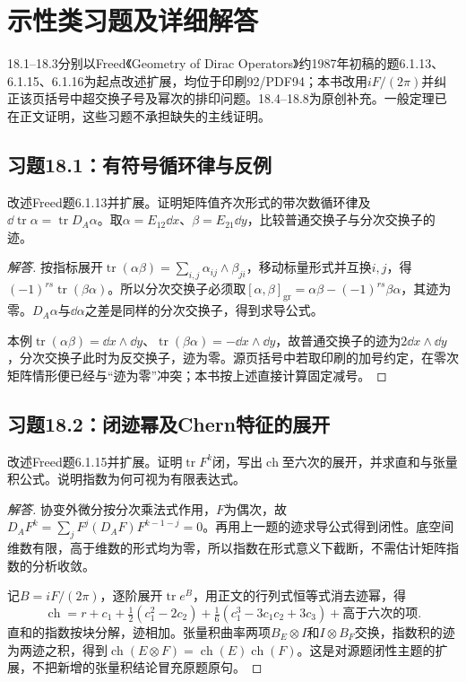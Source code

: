 \section{示性类习题及详细解答}
18.1--18.3分别以Freed《Geometry of Dirac Operators》约1987年初稿的题6.1.13、6.1.15、6.1.16为起点改述扩展，均位于印刷92/PDF94；本书改用$iF/(2\pi)$并纠正该页括号中超交换子号及幂次的排印问题。18.4--18.8为原创补充。一般定理已在正文证明，这些习题不承担缺失的主线证明。

\subsection*{习题18.1：有符号循环律与反例}
改述Freed题6.1.13并扩展。证明矩阵值齐次形式的带次数循环律及$\dd\operatorname{tr}\alpha=\operatorname{tr}D_A\alpha$。取$\alpha=E_{12}\dd x$、$\beta=E_{21}\dd y$，比较普通交换子与分次交换子的迹。
\begin{proof}[解答]
按指标展开$\operatorname{tr}(\alpha\beta)=\sum_{i,j}\alpha_{ij}\wedge\beta_{ji}$，移动标量形式并互换$i,j$，得$(-1)^{rs}\operatorname{tr}(\beta\alpha)$。所以分次交换子必须取$[\alpha,\beta]_{\mathrm{gr}}=\alpha\beta-(-1)^{rs}\beta\alpha$，其迹为零。$D_A\alpha$与$\dd\alpha$之差是同样的分次交换子，得到求导公式。

本例$\operatorname{tr}(\alpha\beta)=\dd x\wedge\dd y$、$\operatorname{tr}(\beta\alpha)=-\dd x\wedge\dd y$，故普通交换子的迹为$2\dd x\wedge\dd y$，分次交换子此时为反交换子，迹为零。源页括号中若取印刷的加号约定，在零次矩阵情形便已经与“迹为零”冲突；本书按上述直接计算固定减号。
\end{proof}

\subsection*{习题18.2：闭迹幂及Chern特征的展开}
改述Freed题6.1.15并扩展。证明$\operatorname{tr}F^k$闭，写出$\operatorname{ch}$至六次的展开，并求直和与张量积公式。说明指数为何可视为有限表达式。
\begin{proof}[解答]
协变外微分按分次乘法式作用，$F$为偶次，故$D_AF^k=\sum_jF^j(D_AF)F^{k-1-j}=0$。再用上一题的迹求导公式得到闭性。底空间维数有限，高于维数的形式均为零，所以指数在形式意义下截断，不需估计矩阵指数的分析收敛。

记$B=iF/(2\pi)$，逐阶展开$\operatorname{tr}e^B$，用正文的行列式恒等式消去迹幂，得
\[
 \operatorname{ch}=r+c_1+\tfrac12(c_1^2-2c_2)
 +\tfrac16(c_1^3-3c_1c_2+3c_3)+\text{高于六次的项}.
\]
直和的指数按块分解，迹相加。张量积曲率两项$B_E\otimes I$和$I\otimes B_F$交换，指数积的迹为两迹之积，得到$\operatorname{ch}(E\otimes F)=\operatorname{ch}(E)\operatorname{ch}(F)$。这是对源题闭性主题的扩展，不把新增的张量积结论冒充原题原句。
\end{proof}

